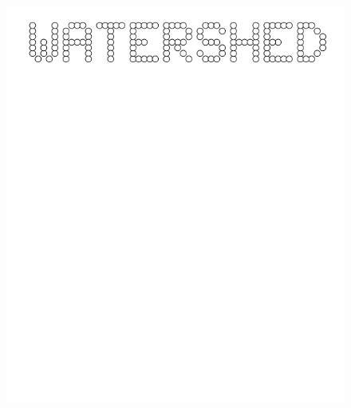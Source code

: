 \documentclass[17pt]{extreport}
\begin{document}
	 \begin{figure}
		\centering
		\includegraphics[width=6.25in]{imageserver/uploadimages/watershed.png}
	\end{figure}
	
\end{document}
